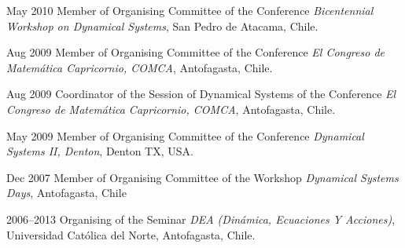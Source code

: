 \documentclass{article}
\begin{document}
\begin{CV}
\item[May 2010] Member of Organising Committee of the Conference
  \emph{ Bicentennial Workshop on Dynamical Systems}, San Pedro de
  Atacama, Chile.

\item[Aug 2009] Member of Organising Committee of the Conference
  \emph{El Congreso de Matemática Capricornio, COMCA}, Antofagasta, Chile.

\item[Aug 2009] Coordinator of the Session of Dynamical Systems of the
  Conference \emph{El Congreso de Matemática Capricornio, COMCA},
  Antofagasta, Chile.

\item[May 2009] Member of Organising Committee of the Conference
  \emph{Dynamical Systems II, Denton}, Denton TX, USA.


\item[Dec 2007] Member of Organising Committee of the Workshop
  \emph{Dynamical Systems Days}, Antofagasta, Chile

\item[2006--2013] Organising of the Seminar \emph{DEA (Dinámica,
    Ecuaciones Y Acciones)}, Universidad Cat\'olica del Norte,
  Antofagasta, Chile.

\end{CV}







\end{document}
